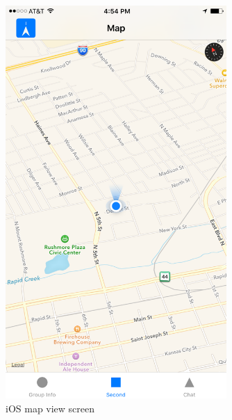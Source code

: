 	\begin{figure}[tbh]
	\begin{center}
	\includegraphics[width=0.75\textwidth]{iOSPictures/img_3899.png}
	\end{center}
	\caption{iOS map view screen \label{iOSmapScreen}}
	\end{figure}


